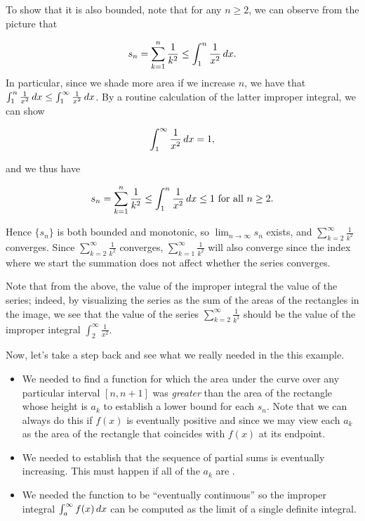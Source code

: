 \documentclass{ximera}
\begin{document}
\begin{model}
To show that it is also bounded, note that for any $n \geq 2$, we can observe from the picture that

\[
s_n = \sum_{k=1}^n\frac{1}{k^2} \leq
\int_1^n \frac{1}{x^2} \mathop{}\!d x.
\]
In particular, since we shade more area if we increase $n$, we have that $\int_1^n \frac{1}{x^2} \mathop{}\!d x \leq \int_1^\infty \frac{1}{x^2} \mathop{}\!d x$.  By a routine calculation of the latter improper integral, we can show

\[
\int_1^\infty \frac{1}{x^2} \mathop{}\!d x = 1,
\]

and we thus have

\[
s_n = \sum_{k=1}^n\frac{1}{k^2} \leq \int_1^n \frac{1}{x^2} \mathop{}\!d x \leq 1 \textrm{ for all } n \geq 2.
\]

Hence $\{s_n\}$ is both bounded and monotonic, so $\lim_{n \to \infty} s_n$ exists, and $\sum_{k=2}^{\infty} \frac{1}{k^2}$ converges.  Since $\sum_{k=2}^{\infty} \frac{1}{k^2}$ converges, $\sum_{k=1}^{\infty} \frac{1}{k^2}$ will also converge since the index where we start the summation does not affect whether the series converges.

Note that from the above, the value of the improper integral  the value of the series; indeed, by visualizing the series as the sum of the areas of the rectangles in the image, we see that the value of the series $\sum_{k=2}^{\infty} \frac{1}{k^2}$ should be  the value of the improper integral $\int_2^{\infty} \frac{1}{x^2}$.

\end{model}


Now, let's take a step back and see what we really needed in the this example.

\begin{itemize}
\item We needed to find a function for which the area under the curve over any particular interval $[n,n+1]$ was \emph{greater} than the area of the rectangle whose height is $a_k$ to establish a lower bound for each $s_n$.  Note that we can always do this if $f(x)$ is eventually positive and  since we may view each $a_k$ as the area of the rectangle that coincides with $f(x)$ at its  endpoint.
\item We needed to establish that the sequence of partial sums is eventually increasing.  This must happen if all of the $a_k$ are .
\item We needed the function to be ``eventually continuous'' so the improper integral $\int_{a}^{\infty} f(x) \mathop{}\!d x$ can be computed as the limit of a single definite integral.
\end{itemize}
\end{document}

